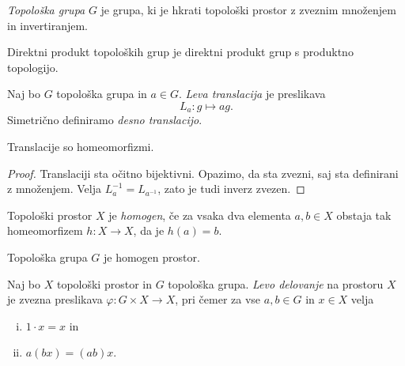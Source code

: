 \begin{definicija}
\emph{Topološka grupa} $G$ je grupa, ki je
hkrati topološki prostor z zveznim množenjem in invertiranjem.
\end{definicija}


\begin{definicija}
Direktni produkt topoloških grup je direktni produkt grup s
produktno topologijo.
\end{definicija}

\begin{definicija}
Naj bo $G$ topološka grupa in $a \in G$.
\emph{Leva translacija} je
preslikava
\[
L_a \colon g \mapsto ag.
\]
Simetrično definiramo \emph{desno translacijo}.
\end{definicija}

\begin{trditev}
Translacije so homeomorfizmi.
\end{trditev}

\begin{proof}
Translaciji sta očitno bijektivni. Opazimo, da sta zvezni, saj sta
definirani z množenjem. Velja $L_a^{-1} = L_{a^{-1}}$, zato je tudi
inverz zvezen.
\end{proof}

\begin{definicija}
Topološki prostor $X$ je
\emph{homogen}, če za vsaka dva
elementa $a, b \in X$ obstaja tak homeomorfizem $h \colon X \to X$,
da je $h(a) = b$.
\end{definicija}

\begin{posledica}
Topološka grupa $G$ je homogen prostor.
\end{posledica}

\begin{definicija}
Naj bo $X$ topološki prostor in $G$ topološka grupa.
\emph{Levo delovanje} na prostoru
$X$ je zvezna preslikava $\varphi \colon G \times X \to X$, pri
čemer za vse $a, b \in G$ in $x \in X$ velja

\begin{enumerate}[i)]
\item $1 \cdot x = x$ in
\item $a(bx) = (ab)x$.
\end{enumerate}
\end{definicija}

